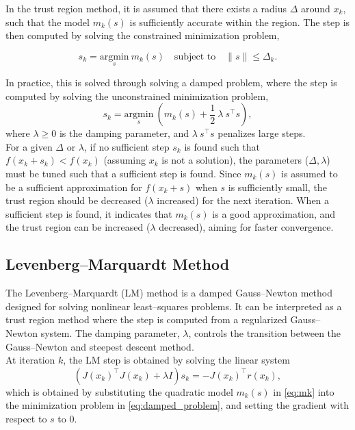 In the trust region method, it is assumed that there exists a radius $\Delta$ around $x_k$, such that the model $m_k(s)$ is sufficiently accurate within the region. The step is then computed by solving the constrained minimization problem,

\begin{equation}
\label{eq:trust_region_subproblem}
    s_k = \underset{s}{\text{argmin}} \ m_k(s) \quad \text{subject to} \quad \|s\| \leq \Delta_k.
\end{equation}

In practice, this is solved through solving a damped problem, where the step is computed by solving the unconstrained minimization problem,
\begin{equation}
\label{eq:damped_problem}
    s_k = \underset{s}{\text{argmin}} \ \left(m_k(s) + \frac{1}{2} \ \lambda \ s^\top s\right),
\end{equation}
where $\lambda \geq 0$ is the damping parameter, and $\lambda \ s^\top s$ penalizes large steps. \\

For a given $\Delta$ or $\lambda$, if no sufficient step $s_k$ is found such that $f(x_k+s_k)<f(x_k)$ (assuming $x_k$ is not a solution), the parameters ($\Delta,\lambda$) must be tuned such that a sufficient step is found. Since $m_k(s)$ is assumed to be a sufficient approximation for $f(x_k+s)$ when $s$ is sufficiently small, the trust region should be decreased ($\lambda$ increased) for the next iteration. When a sufficient step is found, it indicates that $m_k(s)$ is a good approximation, and the trust region can be increased ($\lambda$ decreased), aiming for faster convergence.

\subsection{Levenberg--Marquardt Method} \label{sec:levenberg_marquardt}

The Levenberg--Marquardt (LM) method \cite{madsen2004} is a damped Gauss--Newton method designed for solving nonlinear least--squares problems. It can be interpreted as a trust region method where the step is computed from a regularized Gauss--Newton system. The damping parameter, $\lambda$, controls the transition between the Gauss--Newton and steepest descent method.\\

At iteration $k$, the LM step is obtained by solving the linear system
\begin{equation} \label{eq:lm_system}
    \left( J(x_k)^\top J(x_k) + \lambda I \right) s_k
    =
    - J(x_k)^\top r(x_k),
\end{equation}
which is obtained by substituting the quadratic model $m_k(s)$ in \cref{eq:mk} into the minimization problem in \cref{eq:damped_problem}, and setting the gradient with respect to $s$ to 0.\\

